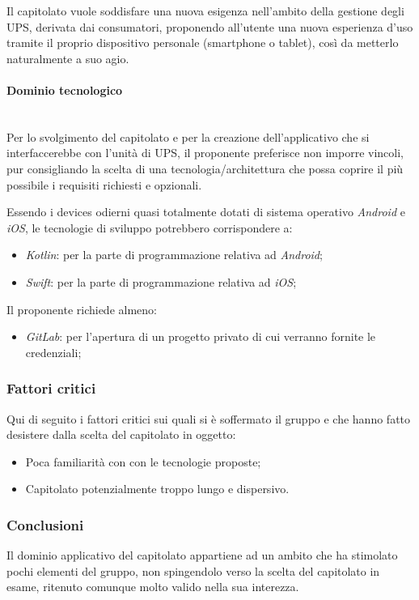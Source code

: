 \documentclass[11pt]{article}
\begin{document}
        \noindent
        Il capitolato vuole soddisfare una nuova esigenza nell'ambito della gestione degli UPS, derivata dai consumatori, proponendo
        all'utente una nuova esperienza d'uso tramite il proprio dispositivo personale (smartphone o tablet), così da metterlo naturalmente
        a suo agio.
        
        \paragraph{Dominio tecnologico}~\\
        
        \noindent
        Per lo svolgimento del capitolato e per la creazione dell'applicativo che si interfaccerebbe con l'unità di UPS, il proponente
        preferisce non imporre vincoli, pur consigliando la scelta di una tecnologia/architettura che possa coprire il più possibile i
        requisiti richiesti e opzionali.
        
        Essendo i devices odierni quasi totalmente dotati di sistema operativo \textit{Android} e \textit{iOS}, le tecnologie di sviluppo
        potrebbero corrispondere a:
        \begin{itemize}
            \item \textit{Kotlin}: per la parte di programmazione relativa ad \textit{Android};
            \item \textit{Swift}: per la parte di programmazione relativa ad \textit{iOS};
        \end{itemize}
        
        Il proponente richiede almeno:
        \begin{itemize}
        	\item \textit{GitLab}: per l'apertura di un progetto privato di cui verranno fornite le credenziali;
        \end{itemize}
    
    \subsubsection{Fattori critici}
    Qui di seguito i fattori critici sui quali si è soffermato il gruppo e che hanno fatto desistere dalla scelta del capitolato in
    oggetto:
    \begin{itemize}
            \item Poca familiarità con con le tecnologie proposte;
            \item Capitolato potenzialmente troppo lungo e dispersivo.
        \end{itemize}

    \subsubsection{Conclusioni}
    Il dominio applicativo del capitolato appartiene ad un ambito che ha stimolato pochi elementi del gruppo, non spingendolo
    verso la scelta del capitolato in esame, ritenuto comunque molto valido nella sua interezza.
\end{document}
